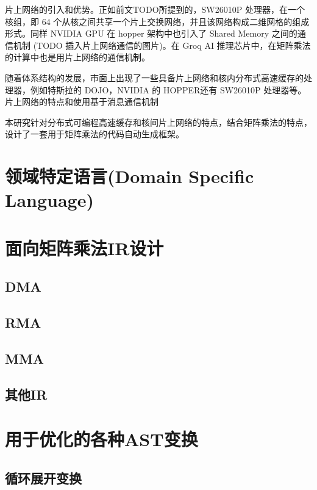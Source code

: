 片上网络的引入和优势。正如前文TODO所提到的，SW26010P 处理器，在一个核组，即 64 个从核之间共享一个片上交换网络，并且该网络构成二维网格的组成形式。同样 NVIDIA GPU 在 hopper 架构中也引入了 Shared Memory 之间的通信机制 (TODO 插入片上网络通信的图片)。在 Groq AI 推理芯片中，在矩阵乘法的计算中也是用片上网络的通信机制。

随着体系结构的发展，市面上出现了一些具备片上网络和核内分布式高速缓存的处理器，例如特斯拉的 DOJO，NVIDIA 的 HOPPER还有 SW26010P 处理器等。片上网络的特点和使用基于消息通信机制

本研究针对分布式可编程高速缓存和核间片上网络的特点，结合矩阵乘法的特点，设计了一套用于矩阵乘法的代码自动生成框架。




\section{领域特定语言(Domain Specific Language)}


\section{面向矩阵乘法IR设计}

\subsection{DMA}


\subsection{RMA}


\subsection{MMA}

\subsection{其他IR}




\section{用于优化的各种AST变换}

\subsection{循环展开变换}

